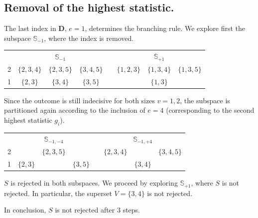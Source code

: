 \documentclass[11pt,a4paper,openright,twoside]{article}
\begin{document}
\subsection{Removal of the highest statistic.}
The last index in $\mathbf{D}$, $e=1$, determines the branching rule. We explore first the subspace $\mathbb{S}_{-1}$, where the index is removed.
\begin{table}[h!]
\centering
\begin{tabular}{c|ccccccc}
 & \multicolumn{3}{c}{$\mathbb{S}_{-1}$} & & \multicolumn{3}{c}{$\mathbb{S}_{+1}$}\\
\cline{2-4} \cline{6-8}
2 & $\{2,3,4\}$ & $\{2,3,5\}$ & $\{3,4,5\}$ & & $\{1,2,3\}$ & $\{1,3,4\}$ & $\{1,3,5\}$ \\
1 & $\{2,3\}$ & $\{3,4\}$ & $\{3,5\}$ & & & $\{1,3\}$ &  \\
\end{tabular}
\end{table}

Since the outcome is still indecisive for both sizes $v=1,2$, the subspace is partitioned again according to the inclusion of $e=4$ (corresponding to the second highest statistic $g_i$).
\begin{table}[h!]
\centering
\begin{tabular}{c|ccccccc}
 & \multicolumn{3}{c}{$\mathbb{S}_{-1,-4}$} & & \multicolumn{3}{c}{$\mathbb{S}_{-1,+4}$}\\
\cline{2-4} \cline{6-8}
2 &  & $\{2,3,5\}$ &  & & $\{2,3,4\}$ &  & $\{3,4,5\}$ \\
1 & $\{2,3\}$ &  & $\{3,5\}$ &  &  & $\{3,4\}$ &  \\
\end{tabular}
\end{table}

$S$ is rejected in both subspaces. We proceed by exploring $\mathbb{S}_{+1}$, where $S$ is not rejected. In particular, the superset $V=\{3,4\}$ is not rejected.

In conclusion, $S$ is not rejected after 3 steps.

\vspace{5mm}
\end{document}

